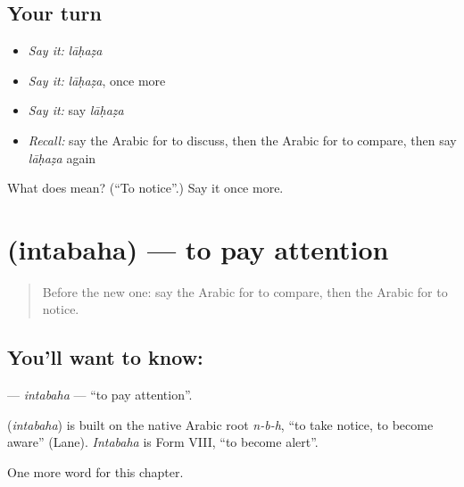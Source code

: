 \subsection*{Your turn}
\begin{itemize}
\raggedright
  \item \emph{Say it:} \emph{lāḥaẓa}
  \item \emph{Say it:} \emph{lāḥaẓa}, once more
  \item \emph{Say it:} say \emph{lāḥaẓa}
  \item \emph{Recall:} say the Arabic for to discuss, then the Arabic for to compare, then say \emph{lāḥaẓa} again
\end{itemize}

\begin{tcolorbox}[breakable,colback=teal!4,colframe=teal!35!black,title={Before you move on}]
What does  mean? (\textquotedblleft{}To notice\textquotedblright{}.) Say it once more.
\end{tcolorbox}
\section[\texorpdfstring{\ar{انتبه} (intabaha)}{انتبه (intabaha)}]{ (intabaha) — to pay attention}

\label{lesson:AR-C197-intabaha}



\begin{quote}
Before the new one: say the Arabic for to compare, then the Arabic for to notice.
\end{quote}

\subsection*{You'll want to know: }
\textbf{} — \emph{intabaha} — \textquotedblleft{}to pay attention\textquotedblright{}.

\begin{cousinweb}
\textbf{} (\emph{intabaha}) is built on the native Arabic root \emph{n-b-h}, \textquotedblleft{}to take notice, to become aware\textquotedblright{} (Lane). \emph{Intabaha} is Form VIII, \textquotedblleft{}to become alert\textquotedblright{}.
\end{cousinweb}

\begin{grammarlens}[title={What you've built}]
One more word for this chapter.
\end{grammarlens}

